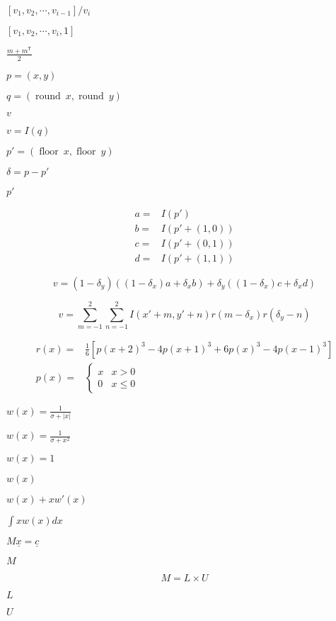 \documentclass{article}
\begin{document}
$[v_1, v_2, \cdots, v_{i-1}] / v_i $
\pagebreak

$[v_1, v_2, \cdots, v_{i}, 1]$
\pagebreak

$ \frac{m + m^{\mathsf T}}{2} $
\pagebreak

$p = (x,y)$
\pagebreak

$q = ( \operatorname{round}\ x, \operatorname{round}\ y)$
\pagebreak

$v$
\pagebreak

$v = I(q)$
\pagebreak

$p' = ( \operatorname{floor}\ x, \operatorname{floor}\ y)$
\pagebreak

$\delta = p - p'$
\pagebreak

$p'$
\pagebreak

\[\begin{array}{rl} a =& I(p')\\ b =& I(p' + (1,0))\\ c =& I(p' + (0,1))\\ d =& I(p' + (1,1)) \end{array} \]
\pagebreak

\[v = (1-\delta_y)((1-\delta_x)a + \delta_xb) + \delta_y((1-\delta_x)c + \delta_xd)\]
\pagebreak

\[ v = \sum_{m=-1}^2\sum_{n=-1}^2 I(x' + m, y' + n)r(m - \delta_x)r(\delta_y-n) \]
\pagebreak

\[\begin{array}{rl} r(x) =& \frac{1}{6}\left[ p(x+2)^3 - 4p(x+1)^3 + 6p(x)^3 - 4p(x-1)^3 \right]\\ p(x) =& \begin{cases}x&x>0\\0&x \le 0\end{cases} \end{array}\]
\pagebreak

$w(x)=\frac{1}{\sigma + |x|}$
\pagebreak

$w(x)=\frac{1}{\sigma + x^2}$
\pagebreak

$w(x)=1$
\pagebreak

$w(x)$
\pagebreak

$w(x) + xw'(x)$
\pagebreak

$\int xw(x)dx$
\pagebreak

$M\underline{x} = \underline{c}$
\pagebreak

$M$
\pagebreak

\[M = L \times U\]
\pagebreak

$L$
\pagebreak

$U$
\pagebreak
\end{document}
